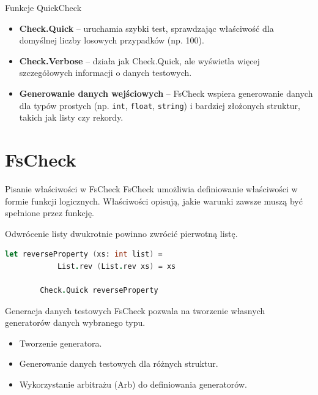    \begin{frame}{Funkcje QuickCheck}
    \begin{itemize}
        \item \textbf{Check.Quick} -- uruchamia szybki test, sprawdzając właściwość dla domyślnej liczby losowych przypadków (np. 100).
        \item \textbf{Check.Verbose} -- działa jak Check.Quick, ale wyświetla więcej szczegółowych informacji o danych testowych.
        \item \textbf{Generowanie danych wejściowych} -- FsCheck wspiera generowanie danych dla typów prostych (np. \texttt{int}, \texttt{float}, \texttt{string}) i bardziej złożonych struktur, takich jak listy czy rekordy.
    \end{itemize}
    \end{frame}
    
    \section{FsCheck}
    
    \begin{frame}[fragile]{Pisanie właściwości w FsCheck}
    FsCheck umożliwia definiowanie właściwości w formie funkcji logicznych. Właściwości opisują, jakie warunki zawsze muszą być spełnione przez funkcję.
    \begin{itemize}
        Odwrócenie listy dwukrotnie powinno zwrócić pierwotną listę.
    \end{itemize}
    \begin{lstlisting}[language=FSharp, xleftmargin=-10pt,xrightmargin=-10pt,numbers=none]
        let reverseProperty (xs: int list) =
            List.rev (List.rev xs) = xs
        
        Check.Quick reverseProperty
        \end{lstlisting}
    \end{frame}
    
    \begin{frame}{Generacja danych testowych}
    FsCheck pozwala na tworzenie własnych generatorów danych wybranego typu.
    \begin{itemize}
        \item Tworzenie generatora.
        \item Generowanie danych testowych dla różnych struktur.
        \item Wykorzystanie arbitrażu (Arb) do definiowania generatorów.
    \end{itemize}
    \end{frame}
    
